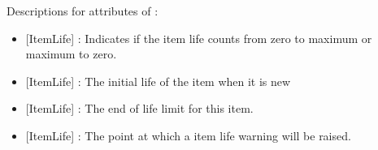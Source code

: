 Descriptions for attributes of :

\begin{itemize}
\item {}[ItemLife] : Indicates if the item life counts from zero to maximum or maximum to zero.
\item {}[ItemLife] : The initial life of the item when it is new
\item {}[ItemLife] : The end of life limit for this item.
\item {}[ItemLife] : The point at which a item life warning will be raised.

\end{itemize}
\FloatBarrier
